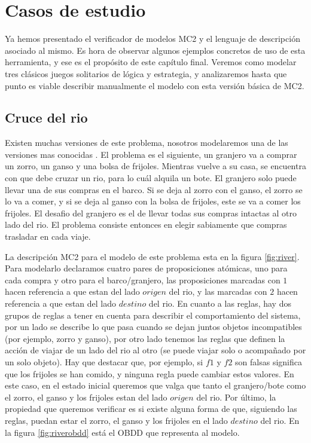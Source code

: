 \chapter{Casos de estudio}

Ya hemos presentado el verificador de modelos MC2 y el lenguaje de descripción asociado al mismo. Es hora de observar algunos ejemplos concretos de uso de esta herramienta, y ese es el propósito de este capítulo final. Veremos como modelar tres clásicos juegos solitarios de lógica y estrategia, y analizaremos hasta que punto es viable describir manualmente el modelo con esta versión básica de MC2.

\section{Cruce del rio}

Existen muchas versiones de este problema, nosotros modelaremos una de las versiones mas conocidas \cite{Hadley:12}. El problema es el siguiente, un granjero va a comprar un zorro, un ganso y una bolsa de frijoles. Mientras vuelve a su casa, se encuentra con que debe cruzar un rio, para lo cuál alquila un bote. El granjero solo puede llevar una de sus compras en el barco. Si se deja al zorro con el ganso, el zorro se lo va a comer, y si se deja al ganso con la bolsa de frijoles, este se va a comer los frijoles. El desafio del granjero es el de llevar todas sus compras intactas al otro lado del rio. El problema consiste entonces en elegir sabiamente que compras trasladar en cada viaje.

La descripción MC2 para el modelo de este problema esta en la figura \ref{fig:river}. Para modelarlo declaramos cuatro pares de proposiciones atómicas, uno para cada compra y otro para el barco/granjero, las proposiciones marcadas con $1$ hacen referencia a que estan del lado $origen$ del rio, y las marcadas con $2$ hacen referencia a que estan del lado $destino$ del rio. En cuanto a las reglas, hay dos grupos de reglas a tener en cuenta para describir el comportamiento del sistema, por un lado se describe lo que pasa cuando se dejan juntos objetos incompatibles (por ejemplo, zorro y ganso), por otro lado tenemos las reglas que definen la acción de viajar de un lado del rio al otro (se puede viajar solo o acompañado por un solo objeto). Hay que destacar que, por ejemplo, si $f1$ y $f2$ son falsas significa que los frijoles se han comido, y ninguna regla puede cambiar estos valores. En este caso, en el estado inicial queremos que valga que tanto el granjero/bote como el zorro, el ganso y los frijoles estan del lado $origen$ del rio. Por último, la propiedad que queremos verificar es si existe alguna forma de que, siguiendo las reglas, puedan estar el zorro, el ganso y los frijoles en el lado $destino$ del rio. En la figura \ref{fig:riverobdd} está el OBDD que representa al modelo.

